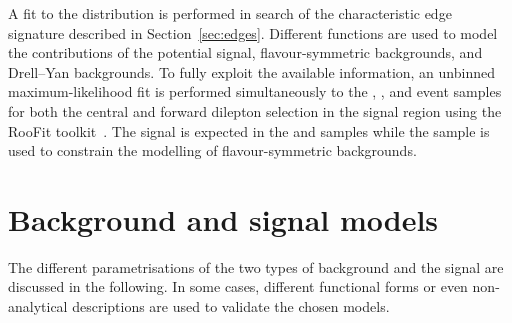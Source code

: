 \label{sec:fit}
A fit to the \mll distribution is performed in search of the characteristic edge signature described in Section~\ref{sec:edges}. Different functions are used to model the contributions of the potential signal, flavour-symmetric backgrounds, and Drell--Yan backgrounds. To fully exploit the available information, an unbinned maximum-likelihood fit is performed simultaneously to the \EE, \MM, and \EM event samples for both the central and forward dilepton selection in the signal region using the RooFit toolkit~\cite{Verkerke:2003ir}. The signal is expected in the \EE and \MM samples while the \EM sample is used to constrain the modelling of flavour-symmetric backgrounds.

\section{Background and signal models}
The different parametrisations of the two types of background and the signal are discussed in the following. In some cases, different functional forms or even non-analytical descriptions are used to validate the chosen models. 

